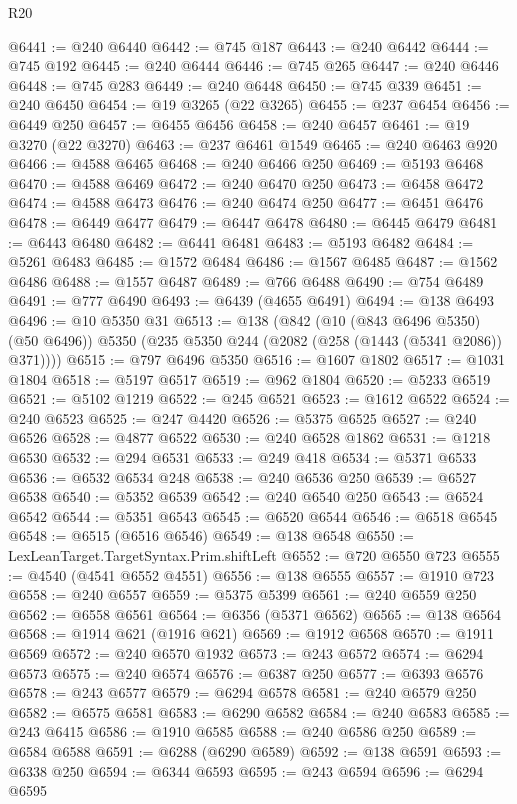 \begin{lexlean}{R20}
\begin{coremodule}
{@6441 := @240 @6440
@6442 := @745 @187
@6443 := @240 @6442
@6444 := @745 @192
@6445 := @240 @6444
@6446 := @745 @265
@6447 := @240 @6446
@6448 := @745 @283
@6449 := @240 @6448
@6450 := @745 @339
@6451 := @240 @6450
@6454 := @19 @3265 (@22 @3265)
@6455 := @237 @6454
@6456 := @6449 @250
@6457 := @6455 @6456
@6458 := @240 @6457
@6461 := @19 @3270 (@22 @3270)
@6463 := @237 @6461 @1549
@6465 := @240 @6463 @920
@6466 := @4588 @6465
@6468 := @240 @6466 @250
@6469 := @5193 @6468
@6470 := @4588 @6469
@6472 := @240 @6470 @250
@6473 := @6458 @6472
@6474 := @4588 @6473
@6476 := @240 @6474 @250
@6477 := @6451 @6476
@6478 := @6449 @6477
@6479 := @6447 @6478
@6480 := @6445 @6479
@6481 := @6443 @6480
@6482 := @6441 @6481
@6483 := @5193 @6482
@6484 := @5261 @6483
@6485 := @1572 @6484
@6486 := @1567 @6485
@6487 := @1562 @6486
@6488 := @1557 @6487
@6489 := @766 @6488
@6490 := @754 @6489
@6491 := @777 @6490
@6493 := @6439 (@4655 @6491)
@6494 := @138 @6493
@6496 := @10 @5350 @31
@6513 := @138
    (@842
      (@10 (@843 @6496 @5350) (@50 @6496))
      @5350
      (@235 @5350 @244 (@2082 (@258 (@1443 (@5341 @2086)) @371))))
@6515 := @797 @6496 @5350
@6516 := @1607 @1802
@6517 := @1031 @1804
@6518 := @5197 @6517
@6519 := @962 @1804
@6520 := @5233 @6519
@6521 := @5102 @1219
@6522 := @245 @6521
@6523 := @1612 @6522
@6524 := @240 @6523
@6525 := @247 @4420
@6526 := @5375 @6525
@6527 := @240 @6526
@6528 := @4877 @6522
@6530 := @240 @6528 @1862
@6531 := @1218 @6530
@6532 := @294 @6531
@6533 := @249 @418
@6534 := @5371 @6533
@6536 := @6532 @6534 @248
@6538 := @240 @6536 @250
@6539 := @6527 @6538
@6540 := @5352 @6539
@6542 := @240 @6540 @250
@6543 := @6524 @6542
@6544 := @5351 @6543
@6545 := @6520 @6544
@6546 := @6518 @6545
@6548 := @6515 (@6516 @6546)
@6549 := @138 @6548
@6550 := LexLeanTarget.TargetSyntax.Prim.shiftLeft
@6552 := @720 @6550 @723
@6555 := @4540 (@4541 @6552 @4551)
@6556 := @138 @6555
@6557 := @1910 @723
@6558 := @240 @6557
@6559 := @5375 @5399
@6561 := @240 @6559 @250
@6562 := @6558 @6561
@6564 := @6356 (@5371 @6562)
@6565 := @138 @6564
@6568 := @1914 @621 (@1916 @621)
@6569 := @1912 @6568
@6570 := @1911 @6569
@6572 := @240 @6570 @1932
@6573 := @243 @6572
@6574 := @6294 @6573
@6575 := @240 @6574
@6576 := @6387 @250
@6577 := @6393 @6576
@6578 := @243 @6577
@6579 := @6294 @6578
@6581 := @240 @6579 @250
@6582 := @6575 @6581
@6583 := @6290 @6582
@6584 := @240 @6583
@6585 := @243 @6415
@6586 := @1910 @6585
@6588 := @240 @6586 @250
@6589 := @6584 @6588
@6591 := @6288 (@6290 @6589)
@6592 := @138 @6591
@6593 := @6338 @250
@6594 := @6344 @6593
@6595 := @243 @6594
@6596 := @6294 @6595
}
\end{coremodule}
\end{lexlean}
